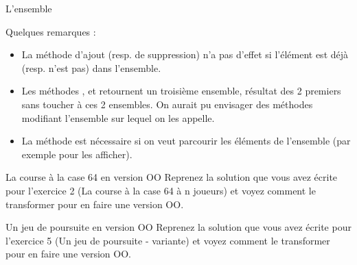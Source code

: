 \begin{Exercice}{L'ensemble}
	\begin{algo}
	\end{algo}
	Quelques remarques :
	\begin{itemize}
		\item 
			La méthode d'ajout (resp. de suppression) n'a
			pas d'effet si l'élément est déjà
			(resp. n'est pas) dans l'ensemble.
		\item 
			Les méthodes , 
			 et 
			 retournent un troisième ensemble, 
			résultat des 2 premiers sans toucher
			à ces 2 ensembles. On aurait pu envisager des méthodes modifiant
			l'ensemble sur lequel on les appelle.
		\item 
			La méthode 
			est nécessaire si on veut parcourir les éléments de
			l'ensemble (par exemple pour les afficher).
	\end{itemize}	
\end{Exercice}

\begin{Exercice}{La course à la case 64 en version OO}
	Reprenez la solution que vous avez écrite pour l'exercice 2
	(La course à la case 64 à n joueurs)
	et voyez comment le transformer pour en faire une version OO.	
\end{Exercice}

\begin{Exercice}{Un jeu de poursuite en version OO}
	Reprenez la solution que vous avez écrite pour l'exercice 5
	(Un jeu de poursuite - variante)
	et voyez comment le transformer pour en faire une version OO.
\end{Exercice}
	
